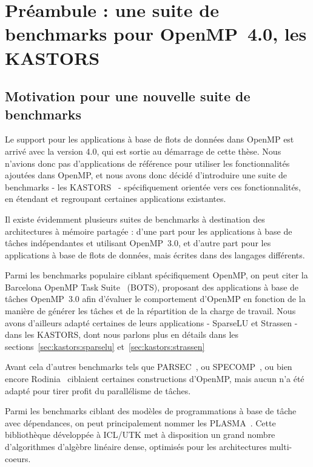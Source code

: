 \section{Préambule : une suite de benchmarks pour OpenMP~4.0, les KASTORS}

\subsection{Motivation pour une nouvelle suite de benchmarks}

Le support pour les applications à base de flots de données dans OpenMP est arrivé avec la version 4.0, qui est sortie au démarrage de cette thèse.
Nous n'avions donc pas d'applications de référence pour utiliser les fonctionnalités ajoutées dans OpenMP, et nous avons donc décidé d'introduire une suite de benchmarks - les KASTORS~\cite{Virouleau2014} - spécifiquement orientée vers ces fonctionnalités, en étendant et regroupant certaines applications existantes.

Il existe évidemment plusieurs suites de benchmarks à destination des architectures à mémoire partagée : d'une part pour les applications à base de tâches indépendantes et utilisant OpenMP~3.0, et d'autre part pour les applications à base de flots de données, mais écrites dans des langages différents.

Parmi les benchmarks populaire ciblant spécifiquement OpenMP, on peut citer la Barcelona OpenMP Task Suite~\cite{Duran2009} (BOTS), proposant des applications à base de tâches OpenMP~3.0 afin d'évaluer le comportement d'OpenMP en fonction de la manière de générer les tâches et de la répartition de la charge de travail.
Nous avons d'ailleurs adapté certaines de leurs applications - SparseLU et Strassen - dans les KASTORS, dont nous parlons plus en détails dans les sections~\ref{sec:kastors:sparselu} et~\ref{sec:kastors:strassen}

Avant cela d'autres benchmarks tels que PARSEC~\cite{Bienia2011}, ou SPECOMP~\cite{Muller2012}, ou bien encore Rodinia~\cite{Rodinia2010} ciblaient certaines constructions d'OpenMP, mais aucun n'a été adapté pour tirer profit du parallélisme de tâches.

Parmi les benchmarks ciblant des modèles de programmations à base de tâche avec dépendances, on peut principalement nommer les PLASMA~\cite{Kurzak2013}.
Cette bibliothèque développée à ICL/UTK met à disposition un grand nombre d'algorithmes d'algèbre linéaire dense, optimisés pour les architectures multi-coeurs.

